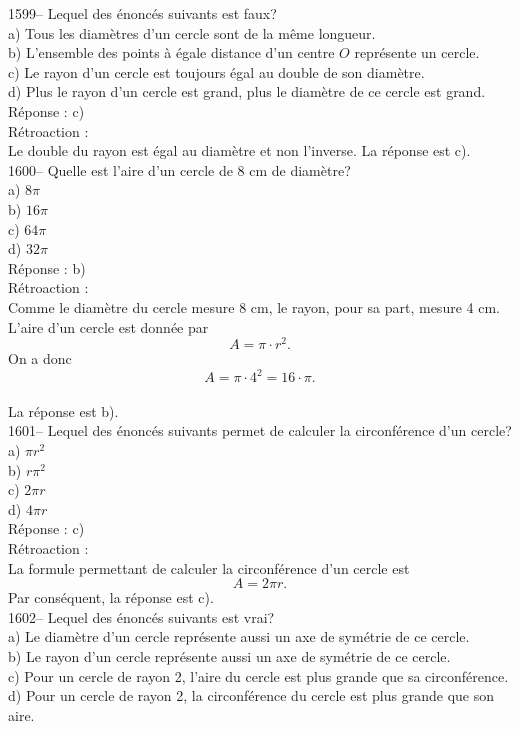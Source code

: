 1599-- Lequel des \'enonc\'es suivants est faux?\\
a) Tous les diam\`etres d'un cercle sont de la m\^eme
longueur.\\
b) L'ensemble des points \`a \'egale distance d'un centre $O$
repr\'esente un
cercle.\\
c) Le rayon d'un cercle est toujours \'egal au double de son diam\`etre.\\
d) Plus le rayon d'un cercle est grand, plus le diam\`etre de ce cercle est
grand.\\

R\'eponse : c)\\

R\'etroaction :\\
Le double du rayon est \'egal au diam\`etre et non l'inverse. La r\'eponse
est c).\\

1600-- Quelle est l'aire d'un cercle de 8 cm de diam\`etre?\\
a) $8\pi$\\
b) $16\pi$\\
c) $64\pi$\\
d) $32\pi$\\

R\'eponse : b)\\

R\'etroaction :\\Comme le diam\`etre du cercle mesure 8 cm, le
rayon, pour sa part, mesure 4 cm. L'aire d'un cercle est donn\'ee
par $$A=\pi\cdot r^2.$$On a donc $$A=\pi\cdot
4^2=16\cdot\pi.$$\\
La r\'eponse est b).\\

1601-- Lequel des \'enonc\'es suivants permet de
calculer la circonf\'erence d'un cercle?\\
a) $\pi r^2$\\
b) $r\pi^2 $\\
c) $2\pi r$\\
d) $4\pi r$\\

R\'eponse : c)\\

R\'etroaction :\\
La formule permettant de calculer la circonf\'erence d'un cercle est
$$A=2\pi r.$$ Par cons\'equent, la r\'eponse est c).\\

1602-- Lequel des \'enonc\'es suivants est vrai?\\
a) Le diam\`etre d'un cercle repr\'esente aussi un axe de sym\'etrie
de ce cercle.\\
b) Le rayon d'un cercle repr\'esente aussi un axe de sym\'etrie de
ce cercle.\\
c) Pour un cercle de rayon 2, l'aire du cercle est plus grande que
sa circonf\'erence.\\
d) Pour un cercle de rayon 2, la circonf\'erence du cercle est plus grande
que son aire.\\

